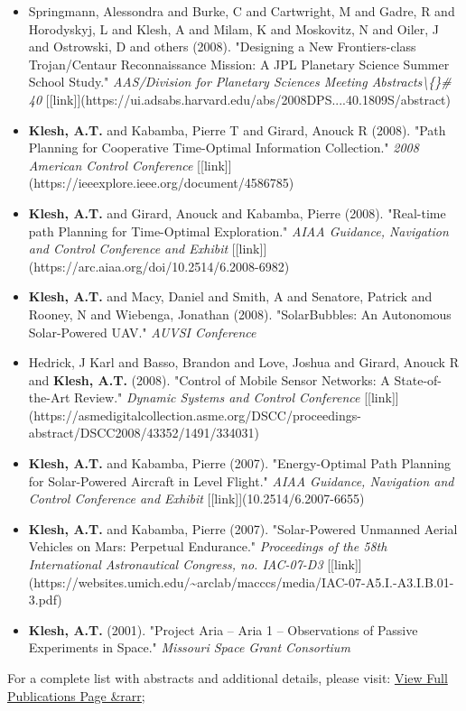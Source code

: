\documentclass[11pt,letterpaper]{article}
\begin{document}
\begin{itemize}
\item Springmann, Alessondra and Burke, C and Cartwright, M and Gadre, R and Horodyskyj, L and Klesh, A and Milam, K and Moskovitz, N and Oiler, J and Ostrowski, D and others (2008). "Designing a New Frontiers-class Trojan/Centaur Reconnaissance Mission: A JPL Planetary Science Summer School Study." \textit{AAS/Division for Planetary Sciences Meeting Abstracts\textbackslash\{\}\# 40} [[link]](https://ui.adsabs.harvard.edu/abs/2008DPS....40.1809S/abstract)
\item \textbf{Klesh, A.T.} and Kabamba, Pierre T and Girard, Anouck R (2008). "Path Planning for Cooperative Time-Optimal Information Collection." \textit{2008 American Control Conference} [[link]](https://ieeexplore.ieee.org/document/4586785)
\item \textbf{Klesh, A.T.} and Girard, Anouck and Kabamba, Pierre (2008). "Real-time path Planning for Time-Optimal Exploration." \textit{AIAA Guidance, Navigation and Control Conference and Exhibit} [[link]](https://arc.aiaa.org/doi/10.2514/6.2008-6982)
\item \textbf{Klesh, A.T.} and Macy, Daniel and Smith, A and Senatore, Patrick and Rooney, N and Wiebenga, Jonathan (2008). "SolarBubbles: An Autonomous Solar-Powered UAV." \textit{AUVSI Conference}
\item Hedrick, J Karl and Basso, Brandon and Love, Joshua and Girard, Anouck R and \textbf{Klesh, A.T.} (2008). "Control of Mobile Sensor Networks: A State-of-the-Art Review." \textit{Dynamic Systems and Control Conference} [[link]](https://asmedigitalcollection.asme.org/DSCC/proceedings-abstract/DSCC2008/43352/1491/334031)
\item \textbf{Klesh, A.T.} and Kabamba, Pierre (2007). "Energy-Optimal Path Planning for Solar-Powered Aircraft in Level Flight." \textit{AIAA Guidance, Navigation and Control Conference and Exhibit} [[link]](10.2514/6.2007-6655)
\item \textbf{Klesh, A.T.} and Kabamba, Pierre (2007). "Solar-Powered Unmanned Aerial Vehicles on Mars: Perpetual Endurance." \textit{Proceedings of the 58th International Astronautical Congress, no. IAC-07-D3} [[link]](https://websites.umich.edu/\textasciitilde{}arclab/macccs/media/IAC-07-A5.I.-A3.I.B.01-3.pdf)
\item \textbf{Klesh, A.T.} (2001). "Project Aria -- Aria 1 -- Observations of Passive Experiments in Space." \textit{Missouri Space Grant Consortium}
\end{itemize}

For a complete list with abstracts and additional details, please visit: \href{publications.html}{View Full Publications Page \&rarr;}
\end{document}

